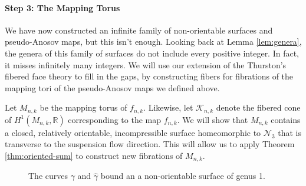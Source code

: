 \paragraph{Step 3: The Mapping Torus}

We have now constructed an infinite family of non-orientable surfaces and pseudo-Anosov maps, but this isn't
enough. Looking back at Lemma \ref{lem:genera}, the genera of this family of surfaces do not include every
positive integer. In fact, it misses infinitely many integers. We will use our extension of the Thurston's
fibered face theory to fill in the gaps, by constructing fibers for fibrations of the mapping tori of the
pseudo-Anosov maps we defined above.

Let $M_{n,k}$ be the mapping torus of $f_{n,k}$. Likewise, let $\mathcal{K}_{n,k}$ denote the fibered cone of
$H^1(M_{n,k},\mathbb{R})$ corresponding to the map $f_{n,k}$. We will show that $M_{n,k}$ contains a closed,
relatively orientable, incompressible surface homeomorphic to $\mathcal{N}_3$ that is transverse to the
suspension flow direction. This will allow us to apply Theorem \ref{thm:oriented-sum} to construct
new fibrations of $M_{n,k}$.

\begin{figure}[h]
    \centering
    \caption{The curves $\gamma$ and $\hat{\gamma}$ bound an a non-orientable surface of genus 1.}
    \label{fig:gammacurves}
\end{figure}

